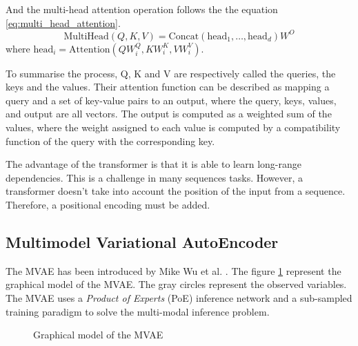 \documentclass[12pt]{report}
\begin{document}
And the multi-head attention operation follows the the equation \ref{eq:multi_head_attention}.
\begin{equation}
    \text{MultiHead}(Q, K, V) = \text{Concat}(\text{head}_1, \dots, \text{head}_d) W^O
    \label{eq:multi_head_attention}
\end{equation}
where $\text{head}_i = \text{Attention}(QW_i^Q, KW_i^K, VW_i^V)$.

To summarise the process, Q, K and V are respectively called the queries, the keys and the values.
Their attention function can be described as mapping a query and a set of key-value pairs to an output, where the query, keys, values, and output are all vectors.
The output is computed as a weighted sum of the values, where the weight assigned to each value is computed by a compatibility function of the query with the corresponding key.

The advantage of the transformer is that it is able to learn long-range dependencies.
This is a challenge in many sequences tasks.
However, a transformer doesn't take into account the position of the input from a sequence. 
Therefore, a positional encoding must be added.

\subsection{Multimodel Variational AutoEncoder}
\label{sec:back:mvae}

The MVAE has been introduced by Mike Wu et al. \cite{wu_multimodal_2018}.
The figure \ref{fig:mvae_graph} represent the graphical model of the MVAE.
The gray circles represent the observed variables.
The MVAE uses a \textit{Product of Experts} (PoE) inference network and a sub-sampled training paradigm to solve the multi-modal inference problem.

\begin{figure}[htbp]
\begin{center}
\caption{Graphical model of the MVAE}
\label{fig:mvae_graph}
\end{center}
\end{figure}
\end{document}
